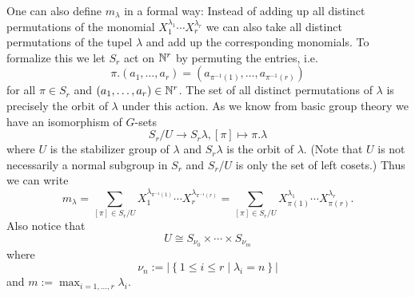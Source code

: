 One can also define $m_\lambda$ in a formal way: Instead of adding up all distinct permutations of the monomial $X_1^{\lambda_1} \cdots X_r^{\lambda_r}$ we can also take all distinct permutations of the tupel $\lambda$ and add up the corresponding monomials. To formalize this we let $S_r$ act on $\mathbb{N}^r$ by permuting the entries, i.e.
\[
 \pi.(a_1, \ldots, a_r) = \left( a_{\pi^{-1}(1)}, \ldots, a_{\pi^{-1}(r)} \right)
\]
for all $\pi \in S_r$ and $(a_1, \ldots, a_r) \in \mathbb{N}^r$. The set of all distinct permutations of $\lambda$ is precisely the orbit of $\lambda$ under this action. As we know from basic group theory we have an isomorphism of $G$-sets
\[
 S_r / U \to S_r \lambda, [\pi] \mapsto \pi.\lambda
\]
where $U$ is the stabilizer group of $\lambda$ and $S_r \lambda$ is the orbit of $\lambda$. (Note that $U$ is not necessarily a normal subgroup in $S_r$ and $S_r/U$ is only the set of left cosets.) Thus we can write
\[
 m_\lambda
 = \sum_{[\pi] \in S_r/U} X_1^{\lambda_{\pi^{-1}(1)}} \cdots X_r^{\lambda_{\pi^{-1}(r)}}
 = \sum_{[\pi] \in S_r/U} X_{\pi(1)}^{\lambda_1} \cdots X_{\pi(r)}^{\lambda_r}.
\]
Also notice that
\[
 U \cong S_{\nu_0} \times \cdots \times S_{\nu_m}
\]
where
\[
 \nu_n := \left|\left\{ 1 \leq i \leq r \mid \lambda_i = n \right\}\right|
\]
and $m := \max_{i=1,\ldots,r} \lambda_i$.


\begin{expl}
\end{expl}



